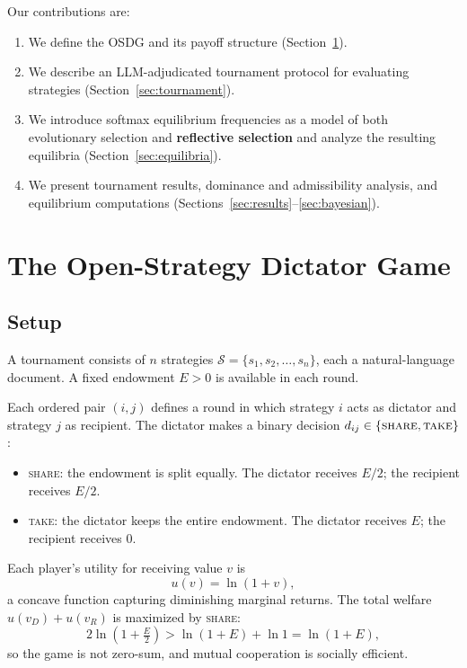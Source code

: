 \documentclass[11pt]{article}
\begin{document}
Our contributions are:
\begin{enumerate}
  \item We define the OSDG and its payoff structure
    (Section~\ref{sec:game}).
  \item We describe an LLM-adjudicated tournament protocol for
    evaluating strategies (Section~\ref{sec:tournament}).
  \item We introduce softmax equilibrium frequencies as a model
    of both evolutionary selection and \textbf{reflective selection} and analyze the resulting equilibria
    (Section~\ref{sec:equilibria}).  %
  \item We present tournament results, dominance and admissibility
    analysis, and equilibrium computations
    (Sections~\ref{sec:results}--\ref{sec:bayesian}).
\end{enumerate}


\section{The Open-Strategy Dictator Game}
\label{sec:game}

\subsection{Setup}

A tournament consists of $n$ strategies
$\mathcal{S} = \{s_1, s_2, \ldots, s_n\}$,
each a natural-language document.
A fixed endowment $E > 0$ is available in each round.

Each ordered pair $(i, j)$ defines a round in which strategy $i$ acts
as dictator and strategy $j$ as recipient.
The dictator makes a binary decision $d_{ij} \in \{\textup{\textsc{share}}, \textup{\textsc{take}}\}$:

\begin{itemize}
  \item \textup{\textsc{share}}: the endowment is split equally.
    The dictator receives $E/2$; the recipient receives $E/2$.
  \item \textup{\textsc{take}}: the dictator keeps the entire endowment.
    The dictator receives $E$; the recipient receives $0$.
\end{itemize}

Each player's utility for receiving value $v$ is
\begin{equation}
  u(v) = \ln(1 + v),
  \label{eq:utility}
\end{equation}
a concave function capturing diminishing marginal returns.
The total welfare $u(v_D) + u(v_R)$ is maximized by \textup{\textsc{share}}:
\begin{equation}
  2\ln\!\left(1 + \tfrac{E}{2}\right) > \ln(1 + E) + \ln 1 = \ln(1 + E),
\end{equation}
so the game is not zero-sum, and mutual cooperation is socially efficient.
\end{document}
